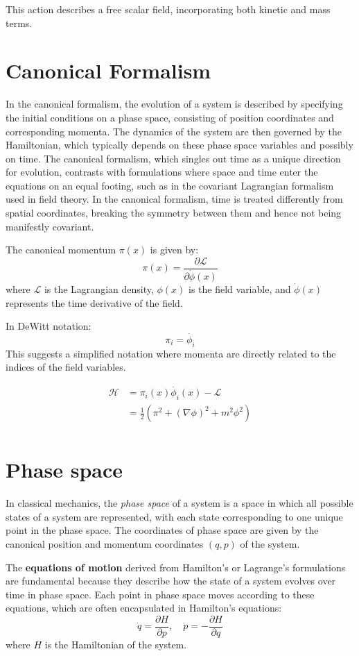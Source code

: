\documentclass{article}
\begin{document}
This action describes a free scalar field, incorporating both kinetic and mass terms.

\section*{Canonical Formalism}

In the canonical formalism, the evolution of a system is described by specifying the initial conditions on a phase space, consisting of position coordinates and corresponding momenta. The dynamics of the system are then governed by the Hamiltonian, which typically depends on these phase space variables and possibly on time. The canonical formalism, which singles out time as a unique direction for evolution, contrasts with formulations where space and time enter the equations on an equal footing, such as in the covariant Lagrangian formalism used in field theory. In the canonical formalism, time is treated differently from spatial coordinates, breaking the symmetry between them and hence not being manifestly covariant.

The canonical momentum \(\pi(x)\) is given by:
\[
\pi(x) = \frac{\partial \mathcal{L}}{\partial \dot{\phi}(x)}
\]
where \(\mathcal{L}\) is the Lagrangian density, \(\phi(x)\) is the field variable, and \(\dot{\phi}(x)\) represents the time derivative of the field.

In DeWitt notation:
\[
    \pi_i = \dot{ \phi_i }
\]
This suggests a simplified notation where momenta are directly related to the indices of the field variables.

\begin{align*}
    \mathcal{H} &= \pi_i(x) \dot{\phi_i}(x) - \mathcal{L} \\
    &= \frac{1}{2} \left( \pi^2 + (\nabla \phi)^2 + m^2 \phi^2 \right) \\
\end{align*}

\section*{Phase space}
In classical mechanics, the \emph{phase space} of a system is a space in which all possible states of a system are represented, with each state corresponding to one unique point in the phase space. The coordinates of phase space are given by the canonical position and momentum coordinates \((q, p)\) of the system. 

The \textbf{equations of motion} derived from Hamilton's or Lagrange's formulations are fundamental because they describe how the state of a system evolves over time in phase space. Each point in phase space moves according to these equations, which are often encapsulated in Hamilton's equations:
\[
\dot{q} = \frac{\partial H}{\partial p}, \quad \dot{p} = -\frac{\partial H}{\partial q}
\]
where \(H\) is the Hamiltonian of the system. 
\end{document}
